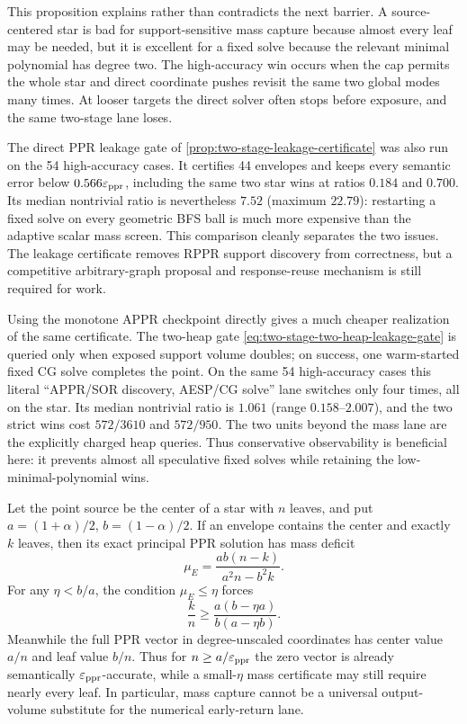 This proposition explains rather than contradicts the next barrier.  A
source-centered star is bad for support-sensitive mass capture because almost
every leaf may be needed, but it is excellent for a fixed solve because the
relevant minimal polynomial has degree two.  The high-accuracy win occurs
when the cap permits the whole star and direct coordinate pushes revisit the
same two global modes many times.  At looser targets the direct solver often
stops before exposure, and the same two-stage lane loses.

The direct PPR leakage gate of
\cref{prop:two-stage-leakage-certificate} was also run on the 54 high-accuracy
cases.  It certifies 44 envelopes and keeps every semantic error below
$0.566\varepsilon_{\mathrm{ppr}}$, including the same two star wins at ratios $0.184$ and
$0.700$.  Its median nontrivial ratio is nevertheless $7.52$ (maximum
$22.79$): restarting a fixed solve on every geometric BFS ball is much more
expensive than the adaptive scalar mass screen.  This comparison cleanly
separates the two issues.  The leakage certificate removes RPPR support
discovery from correctness, but a competitive arbitrary-graph proposal and
response-reuse mechanism is still required for work.

Using the monotone APPR checkpoint directly gives a much cheaper realization
of the same certificate.  The two-heap gate
\cref{eq:two-stage-two-heap-leakage-gate} is queried only when exposed support
volume doubles; on success, one warm-started fixed CG solve completes the
point.  On the same 54 high-accuracy cases this literal
``APPR/SOR discovery, AESP/CG solve'' lane switches only four times, all on
the star.  Its median nontrivial ratio is $1.061$ (range
$0.158$--$2.007$), and the two strict wins cost $572/3610$ and $572/950$.
The two units beyond the mass lane are the explicitly charged heap queries.
Thus conservative observability is beneficial here: it prevents almost all
speculative fixed solves while retaining the low-minimal-polynomial wins.

\begin{proposition}
\label{prop:two-stage-star-mass-barrier}
Let the point source be the center of a star with $n$ leaves, and put
$a=(1+\alpha)/2$, $b=(1-\alpha)/2$.  If an envelope contains the center and
exactly $k$ leaves, then its exact principal PPR solution has mass deficit
\begin{equation}
 \mu_E=\frac{ab(n-k)}{a^2n-b^2k}.
 \label{eq:two-stage-star-mass-deficit}
\end{equation}
For any $\eta<b/a$, the condition $\mu_E\leq\eta$ forces
\begin{equation}
 \frac{k}{n}\geq
 \frac{a(b-\eta a)}{b(a-\eta b)}.
 \label{eq:two-stage-star-mass-fraction}
\end{equation}
Meanwhile the full PPR vector in degree-unscaled coordinates has center value
$a/n$ and leaf value $b/n$.  Thus for $n\geq a/\varepsilon_{\mathrm{ppr}}$ the zero vector is
already semantically $\varepsilon_{\mathrm{ppr}}$-accurate, while a small-$\eta$ mass certificate
may still require nearly every leaf.  In particular, mass capture cannot be
a universal output-volume substitute for the numerical early-return lane.
\end{proposition}

